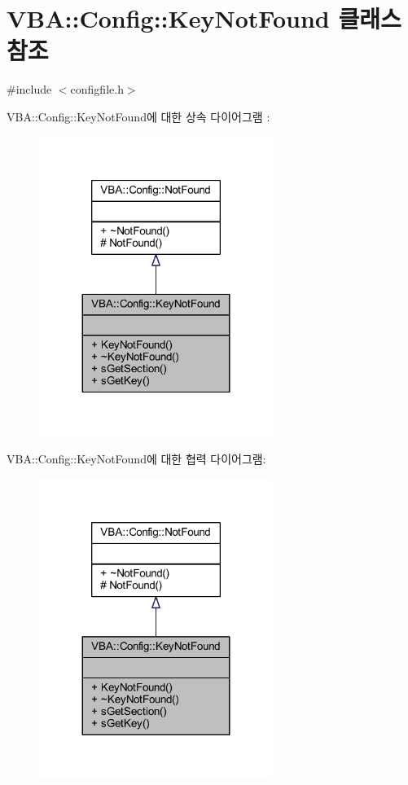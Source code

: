 \hypertarget{class_v_b_a_1_1_config_1_1_key_not_found}{}\section{V\+BA\+:\+:Config\+:\+:Key\+Not\+Found 클래스 참조}
\label{class_v_b_a_1_1_config_1_1_key_not_found}


{\ttfamily \#include $<$configfile.\+h$>$}



V\+BA\+:\+:Config\+:\+:Key\+Not\+Found에 대한 상속 다이어그램 \+: \nopagebreak
\begin{figure}[H]
\begin{center}
\leavevmode
\includegraphics[width=215pt]{class_v_b_a_1_1_config_1_1_key_not_found__inherit__graph}
\end{center}
\end{figure}


V\+BA\+:\+:Config\+:\+:Key\+Not\+Found에 대한 협력 다이어그램\+:\nopagebreak
\begin{figure}[H]
\begin{center}
\leavevmode
\includegraphics[width=215pt]{class_v_b_a_1_1_config_1_1_key_not_found__coll__graph}
\end{center}
\end{figure}
